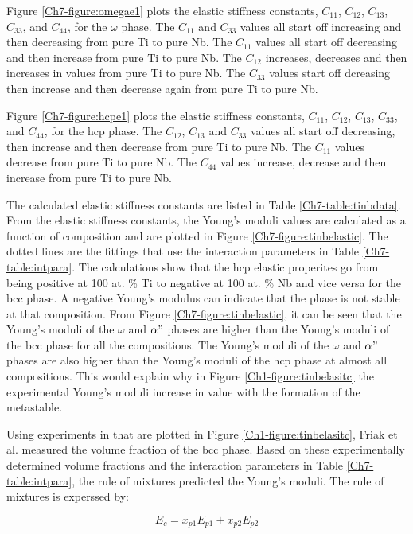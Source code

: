 Figure \ref{Ch7-figure:omegae1} plots the elastic stiffness constants, $C_{11}$, $C_{12}$, $C_{13}$, $C_{33}$, and $C_{44}$, for the $\omega$ phase. The $C_{11}$ and $C_{33}$ values all start off increasing and then decreasing from pure Ti to pure Nb. The $C_{11}$ values all start off decreasing and then increase from pure Ti to pure Nb. The $C_{12}$ increases, decreases and then increases in values from pure Ti to pure Nb. The $C_{33}$ values start off dcreasing then increase and then decrease again from pure Ti to pure Nb. 

Figure \ref{Ch7-figure:hcpe1} plots the elastic stiffness constants, $C_{11}$, $C_{12}$, $C_{13}$, $C_{33}$, and $C_{44}$, for the hcp phase. The $C_{12}$, $C_{13}$ and $C_{33}$ values all start off decreasing, then increase and then decrease from pure Ti to pure Nb. The $C_{11}$ values decrease from pure Ti to pure Nb. The $C_{44}$ values increase, decrease and then increase from pure Ti to pure Nb. 

The calculated elastic stiffness constants are listed in Table \ref{Ch7-table:tinbdata}. From the elastic stiffness constants, the Young's moduli values are calculated as a function of composition and are plotted in Figure \ref{Ch7-figure:tinbelastic}. The dotted lines are the fittings that use the interaction parameters in Table \ref{Ch7-table:intpara}. The calculations show that the hcp elastic properites go from being positive at 100 at. \% Ti to negative at 100 at. \% Nb and vice versa for the bcc phase. A negative Young's modulus can indicate that the phase is not stable at that composition. From Figure \ref{Ch7-figure:tinbelastic}, it can be seen that the Young's moduli of the $\omega$ and $\alpha"$ phases are higher than the Young's moduli of the bcc phase for all the compositions. The Young's moduli of the $\omega$ and $\alpha"$ phases are also higher than the Young's moduli of the hcp phase at almost all compositions. This would explain why in Figure \ref{Ch1-figure:tinbelasitc} the experimental Young's moduli increase in value with the formation of the metastable. 

Using experiments in that are plotted in Figure \ref{Ch1-figure:tinbelasitc}, Friak et al. \cite{Friak2012} measured the volume fraction of the bcc phase. Based on these experimentally determined volume fractions and the interaction parameters in Table \ref{Ch7-table:intpara}, the rule of mixtures predicted the Young's moduli. The rule of mixtures is experssed by: 

\begin{equation}
\label{eq:ruleofmix}
E_{c}=x_{p1}E_{p1}+x_{p2}E_{p2}
\end{equation}

